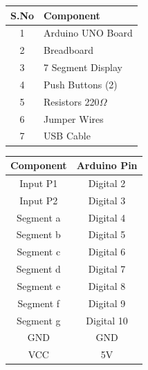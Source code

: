 \documentclass[a4paper,12pt]{article}
\begin{document}
\begin{center}

\begin{minipage}{0.45\textwidth}

\begin{table}[H]
\centering

\begin{tabular}{|c|l|}
\hline
\textbf{S.No} & \textbf{Component} \\ \hline
1 & Arduino UNO Board \\ \hline
2 & Breadboard \\ \hline
3 & 7 Segment Display \\ \hline
4 & Push Buttons (2) \\ \hline
5 & Resistors 220$\Omega$ \\ \hline
6 & Jumper Wires \\ \hline
7 & USB Cable \\ \hline
\end{tabular}

\end{table}

\end{minipage}
\hspace{0.05\textwidth}

\begin{minipage}{0.45\textwidth}

\begin{table}[H]
\centering

\begin{tabular}{|c|c|}
\hline
\textbf{Component} & \textbf{Arduino Pin} \\ \hline
Input P1 & Digital 2 \\ \hline
Input P2 & Digital 3 \\ \hline
Segment a & Digital 4 \\ \hline
Segment b & Digital 5 \\ \hline
Segment c & Digital 6 \\ \hline
Segment d & Digital 7 \\ \hline
Segment e & Digital 8 \\ \hline
Segment f & Digital 9 \\ \hline
Segment g & Digital 10 \\ \hline
GND & GND \\ \hline
VCC & 5V \\ \hline
\end{tabular}

\end{table}

\end{minipage}

\end{center}
\end{document}

